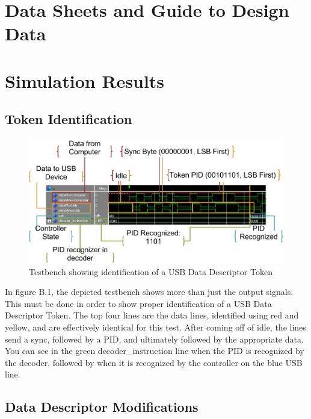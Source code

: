\documentclass[12pt,letter,oneside]{report}
\begin{document}
\chapter{Data Sheets and Guide to Design Data}

\chapter{Simulation Results}
\section{Token Identification}
\begin{figure}[h!]
	\centering
	\caption{Testbench showing identification of a USB Data Descriptor Token}
	\includegraphics[width=.98\textwidth]{tokenRecognition}
\end{figure}
In figure B.1, the depicted testbench shows more than just the output signals. This must be done in order to show proper identification of a USB Data Descriptor Token. The top four lines are the data lines, identified using red and yellow, and are effectively identical for this test. After coming off of idle, the lines send a sync, followed by a PID, and ultimately followed by the appropriate data. You can see in the green decoder\_instruction line when the PID is recognized by the decoder, followed by when it is recognized by the controller on the blue USB line. 
\pagebreak
\section{Data Descriptor Modifications}
\end{document}
